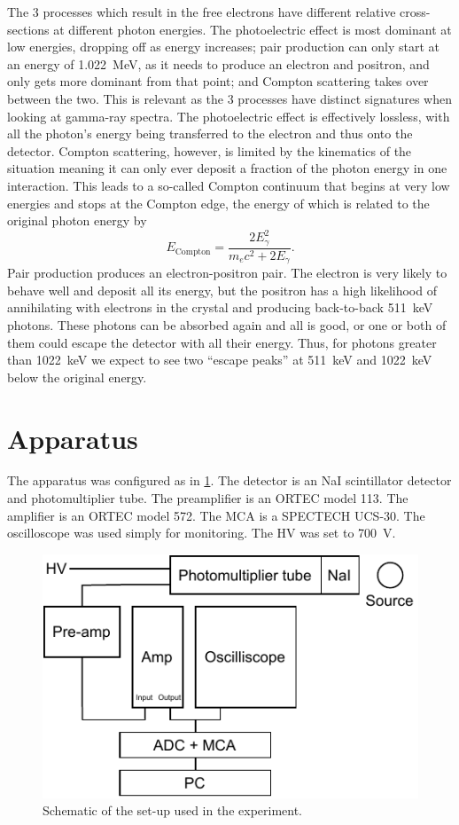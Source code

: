 \documentclass[11pt]{article}
\numberwithin{equation}{section}
\numberwithin{figure}{section}
\numberwithin{table}{section}
\begin{document}
The 3 processes which result in the free electrons have different relative cross-sections at different photon energies. The photoelectric effect is most dominant at low energies, dropping off as energy increases; pair production can only start at an energy of \SI{1.022}{\mega\electronvolt}, as it needs to produce an electron and positron, and only gets more dominant from that point; and Compton scattering takes over between the two. This is relevant as the 3 processes have distinct signatures when looking at gamma-ray spectra. The photoelectric effect is effectively lossless, with all the photon's energy being transferred to the electron and thus onto the detector. Compton scattering, however, is limited by the kinematics of the situation meaning it can only ever deposit a fraction of the photon energy in one interaction. This leads to a so-called Compton continuum that begins at very low energies and stops at the Compton edge, the energy of which is related to the original photon energy by 
\begin{equation}
    E_\mathrm{Compton}=\frac{2E_\gamma^2}{m_e c^2 + 2E_\gamma}.
\end{equation}
Pair production produces an electron-positron pair. The electron is very likely to behave well and deposit all its energy, but the positron has a high likelihood of annihilating with electrons in the crystal and producing back-to-back \SI{511}{\kilo\electronvolt} photons. These photons can be absorbed again and all is good, or one or both of them could escape the detector with all their energy. Thus, for photons greater than \SI{1022}{\kilo\electronvolt} we expect to see two ``escape peaks'' at \SI{511}{\kilo\electronvolt} and \SI{1022}{\kilo\electronvolt} below the original energy. 

\section{Apparatus}\label{sec:Apparatus}
The apparatus was configured as in \cref{fig:Apparatus}. The detector is an NaI scintillator detector and photomultiplier tube. The preamplifier is an ORTEC model 113. The amplifier is an ORTEC model 572. The MCA is a SPECTECH UCS-30. The oscilloscope was used simply for monitoring. The HV was set to \SI{700}{\volt}.

\begin{figure}[h]
    \begin{center}
        \includegraphics[width=.4\textwidth]{Plots/apparatus.pdf}
        \caption{Schematic of the set-up used in the experiment.}
        \label{fig:Apparatus}
    \end{center}
\end{figure}
\end{document}
